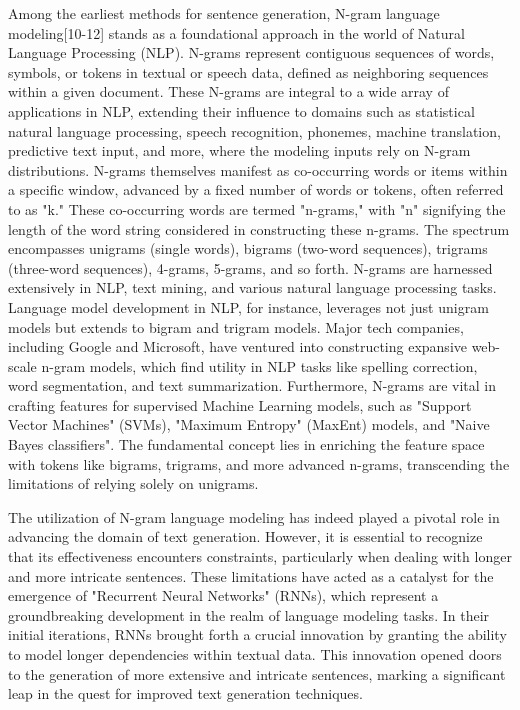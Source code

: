 \documentclass[conference]{IEEEtran}
\begin{document}
Among the earliest methods for sentence generation, N-gram language modeling[10-12] stands as a foundational approach in the world of Natural Language Processing (NLP). N-grams represent contiguous sequences of words, symbols, or tokens in textual or speech data, defined as neighboring sequences within a given document. These N-grams are integral to a wide array of applications in NLP, extending their influence to domains such as statistical natural language processing, speech recognition, phonemes, machine translation, predictive text input, and more, where the modeling inputs rely on N-gram distributions. N-grams themselves manifest as co-occurring words or items within a specific window, advanced by a fixed number of words or tokens, often referred to as "k." These co-occurring words are termed "n-grams," with "n" signifying the length of the word string considered in constructing these n-grams. The spectrum encompasses unigrams (single words), bigrams (two-word sequences), trigrams (three-word sequences), 4-grams, 5-grams, and so forth. N-grams are harnessed extensively in NLP, text mining, and various natural language processing tasks. Language model development in NLP, for instance, leverages not just unigram models but extends to bigram and trigram models. Major tech companies, including Google and Microsoft, have ventured into constructing expansive web-scale n-gram models, which find utility in NLP tasks like spelling correction, word segmentation, and text summarization. Furthermore, N-grams are vital in crafting features for supervised Machine Learning models, such as "Support Vector Machines" (SVMs), "Maximum Entropy" (MaxEnt) models, and "Naive Bayes classifiers". The fundamental concept lies in enriching the feature space with tokens like bigrams, trigrams, and more advanced n-grams, transcending the limitations of relying solely on unigrams.




The utilization of N-gram language modeling has indeed played a pivotal role in advancing the domain of text generation. However, it is essential to recognize that its effectiveness encounters constraints, particularly when dealing with longer and more intricate sentences. These limitations have acted as a catalyst for the emergence of "Recurrent Neural Networks" (RNNs), which represent a groundbreaking development in the realm of language modeling tasks. In their initial iterations, RNNs brought forth a crucial innovation by granting the ability to model longer dependencies within textual data. This innovation opened doors to the generation of more extensive and intricate sentences, marking a significant leap in the quest for improved text generation techniques.
\end{document}

